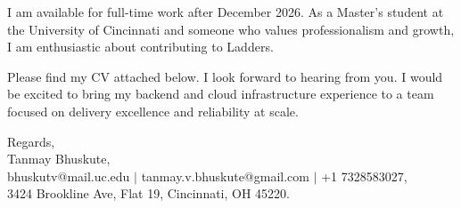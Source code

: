 \documentclass[11pt]{letter}
\begin{document}
\begin{letter}{}
I am available for full-time work after December 2026. As a Master's student at the University of Cincinnati and someone who values professionalism and growth, I am enthusiastic about contributing to Ladders.

Please find my CV attached below. I look forward to hearing from you. I would be excited to bring my backend and cloud infrastructure experience to a team focused on delivery excellence and reliability at scale.

{\setlength{\parskip}{0pt}
Regards,\\
Tanmay Bhuskute,\\
bhuskutv@mail.uc.edu $\mid$ tanmay.v.bhuskute@gmail.com $\mid$ +1 7328583027,\\
3424 Brookline Ave, Flat 19, Cincinnati, OH 45220.
}

\end{letter}
\end{document}
